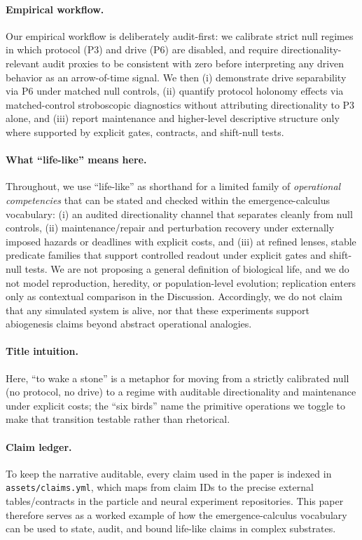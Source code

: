 \documentclass[11pt]{article}
\begin{document}
\paragraph{Empirical workflow.}
Our empirical workflow is deliberately audit-first: we calibrate strict null regimes in which protocol (P3) and drive (P6) are disabled, and require directionality-relevant audit proxies to be consistent with zero before interpreting any driven behavior as an arrow-of-time signal. We then (i) demonstrate drive separability via P6 under matched null controls, (ii) quantify protocol holonomy effects via matched-control stroboscopic diagnostics without attributing directionality to P3 alone, and (iii) report maintenance and higher-level descriptive structure only where supported by explicit gates, contracts, and shift-null tests.

\paragraph{What ``life-like'' means here.}
Throughout, we use ``life-like'' as shorthand for a limited family of \emph{operational competencies} that can be stated and checked within the emergence-calculus vocabulary: (i) an audited directionality channel that separates cleanly from null controls, (ii) maintenance/repair and perturbation recovery under externally imposed hazards or deadlines with explicit costs, and (iii) at refined lenses, stable predicate families that support controlled readout under explicit gates and shift-null tests. We are not proposing a general definition of biological life, and we do not model reproduction, heredity, or population-level evolution; replication enters only as contextual comparison in the Discussion. Accordingly, we do not claim that any simulated system is alive, nor that these experiments support abiogenesis claims beyond abstract operational analogies.

\paragraph{Title intuition.}
Here, ``to wake a stone'' is a metaphor for moving from a strictly calibrated null (no protocol, no drive) to a regime with auditable directionality and maintenance under explicit costs; the ``six birds'' name the primitive operations we toggle to make that transition testable rather than rhetorical.

\paragraph{Claim ledger.}
To keep the narrative auditable, every claim used in the paper is indexed in \texttt{assets/claims.yml}, which maps from claim IDs to the precise external tables/contracts in the particle and neural experiment repositories. This paper therefore serves as a worked example of how the emergence-calculus vocabulary can be used to state, audit, and bound life-like claims in complex substrates.
\end{document}
